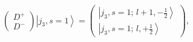 \begin{equation}
\left(
\begin{array}{c}
D^{+} \\
D^{-}
\end{array}
\right) \left| j_{3},s=1\right\rangle =\left(
\begin{array}{c}
\left| j_{3},s=1;\,l+1,-\frac{1}{2}\right\rangle \\
\left| j_{3},s=1;\,l,+\frac{1}{2}\right\rangle
\end{array}
\right) ,
\end{equation}

